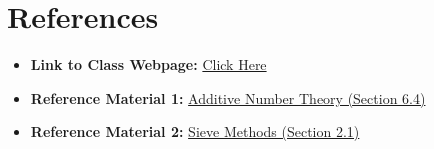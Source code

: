 \section{References}
\begin{itemize}
    \item \textbf{Link to Class Webpage:} \href{https://www.math.columbia.edu/~avizeff/additive/index.html}{Click Here}
    \item \textbf{Reference Material 1:} \href{http://www.alefenu.com/libri/nathansonbases.pdf}{Additive Number Theory (Section 6.4)}
    \item \textbf{Reference Material 2:} \href{https://pages.cs.wisc.edu/~cdx/Sieve.pdf}{Sieve Methods (Section 2.1)}
\end{itemize}


